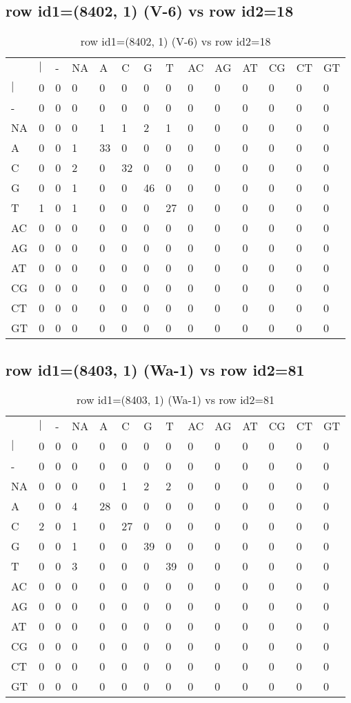 \subsection{row id1=(8402, 1) (V-6) vs row id2=18}
\begin{center}
\begin{longtable}{|l|l|l|l|l|l|l|l|l|l|l|l|l|l|}
\caption{row id1=(8402, 1) (V-6) vs row id2=18} \label{table_dm660}\\
\hline
\\
\hline
&$|$&-&NA&A&C&G&T&AC&AG&AT&CG&CT&GT\\
$|$&0&0&0&0&0&0&0&0&0&0&0&0&0\\
-&0&0&0&0&0&0&0&0&0&0&0&0&0\\
NA&0&0&0&1&1&2&1&0&0&0&0&0&0\\
A&0&0&1&33&0&0&0&0&0&0&0&0&0\\
C&0&0&2&0&32&0&0&0&0&0&0&0&0\\
G&0&0&1&0&0&46&0&0&0&0&0&0&0\\
T&1&0&1&0&0&0&27&0&0&0&0&0&0\\
AC&0&0&0&0&0&0&0&0&0&0&0&0&0\\
AG&0&0&0&0&0&0&0&0&0&0&0&0&0\\
AT&0&0&0&0&0&0&0&0&0&0&0&0&0\\
CG&0&0&0&0&0&0&0&0&0&0&0&0&0\\
CT&0&0&0&0&0&0&0&0&0&0&0&0&0\\
GT&0&0&0&0&0&0&0&0&0&0&0&0&0\\
\hline
\end{longtable}
\end{center}

\subsection{row id1=(8403, 1) (Wa-1) vs row id2=81}
\begin{center}
\begin{longtable}{|l|l|l|l|l|l|l|l|l|l|l|l|l|l|}
\caption{row id1=(8403, 1) (Wa-1) vs row id2=81} \label{table_dm662}\\
\hline
\\
\hline
&$|$&-&NA&A&C&G&T&AC&AG&AT&CG&CT&GT\\
$|$&0&0&0&0&0&0&0&0&0&0&0&0&0\\
-&0&0&0&0&0&0&0&0&0&0&0&0&0\\
NA&0&0&0&0&1&2&2&0&0&0&0&0&0\\
A&0&0&4&28&0&0&0&0&0&0&0&0&0\\
C&2&0&1&0&27&0&0&0&0&0&0&0&0\\
G&0&0&1&0&0&39&0&0&0&0&0&0&0\\
T&0&0&3&0&0&0&39&0&0&0&0&0&0\\
AC&0&0&0&0&0&0&0&0&0&0&0&0&0\\
AG&0&0&0&0&0&0&0&0&0&0&0&0&0\\
AT&0&0&0&0&0&0&0&0&0&0&0&0&0\\
CG&0&0&0&0&0&0&0&0&0&0&0&0&0\\
CT&0&0&0&0&0&0&0&0&0&0&0&0&0\\
GT&0&0&0&0&0&0&0&0&0&0&0&0&0\\
\hline
\end{longtable}
\end{center}

